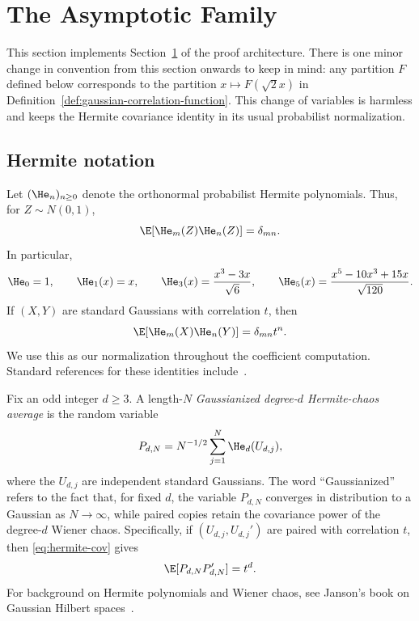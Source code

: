 \section{The Asymptotic Family}
\label{sec:scheme}

This section implements Section~\ref{sec:scheme} of the proof architecture.  There is one minor change in convention from this section onwards to keep in mind: any partition $F$ defined below corresponds to the partition $x\mapsto F(\sqrt2 x)$ in Definition~\ref{def:gaussian-correlation-function}.  This change of variables is harmless and keeps the Hermite covariance identity in its usual probabilist normalization.

\subsection{Hermite notation}

\begin{definition}\label{def:Hermite}
Let $(\He_n)_{n\ge0}$ denote the orthonormal probabilist Hermite polynomials.  Thus, for $Z\sim N(0,1)$,
\[
  \E[\He_m(Z)\He_n(Z)]=\delta_{mn}.
\]
In particular,
\[
  \He_0=1,
  \qquad \He_1(x)=x,
  \qquad \He_3(x)={x^3-3x\over\sqrt6},
  \qquad \He_5(x)={x^5-10x^3+15x\over\sqrt{120}}.
\]
If $(X,Y)$ are standard Gaussians with correlation $t$, then
\begin{equation}\label{eq:hermite-cov}
  \E[\He_m(X)\He_n(Y)]=\delta_{mn}t^n.
\end{equation}
We use this as our normalization throughout the coefficient computation.  Standard references for these identities include~\cite[Sec.~6.1]{AAR99}.
\end{definition}

\begin{definition}\label{def:gaussianized-chaos}
Fix an odd integer $d\ge3$.  A length-$N$ \emph{Gaussianized degree-$d$ Hermite-chaos average} is the random variable
\[
  P_{d,N}=N^{-1/2}\sum_{j=1}^N \He_d(U_{d,j}),
\]
where the $U_{d,j}$ are independent standard Gaussians.  The word ``Gaussianized'' refers to the fact that, for fixed $d$, the variable $P_{d,N}$ converges in distribution to a Gaussian as $N\to\infty$, while paired copies retain the covariance power of the degree-$d$ Wiener chaos.  Specifically, if $(U_{d,j},U_{d,j}')$ are paired with correlation $t$, then \eqref{eq:hermite-cov} gives
\[
  \E[P_{d,N}P_{d,N}']=t^d.
\]
For background on Hermite polynomials and Wiener chaos, see Janson's book on Gaussian Hilbert spaces~\cite{Janson1997GaussianHilbertSpaces}.
\end{definition}

